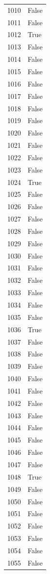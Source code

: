 \documentclass[
  letterpaper,
  DIV=11,
  numbers=noendperiod]{scrreprt}
\begin{document}
\begin{tabular}{ll}
1010 &  False \\
1011 &  False \\
1012 &   True \\
1013 &  False \\
1014 &  False \\
1015 &  False \\
1016 &  False \\
1017 &  False \\
1018 &  False \\
1019 &  False \\
1020 &  False \\
1021 &  False \\
1022 &  False \\
1023 &  False \\
1024 &   True \\
1025 &  False \\
1026 &  False \\
1027 &  False \\
1028 &  False \\
1029 &  False \\
1030 &  False \\
1031 &  False \\
1032 &  False \\
1033 &  False \\
1034 &  False \\
1035 &  False \\
1036 &   True \\
1037 &  False \\
1038 &  False \\
1039 &  False \\
1040 &  False \\
1041 &  False \\
1042 &  False \\
1043 &  False \\
1044 &  False \\
1045 &  False \\
1046 &  False \\
1047 &  False \\
1048 &   True \\
1049 &  False \\
1050 &  False \\
1051 &  False \\
1052 &  False \\
1053 &  False \\
1054 &  False \\
1055 &  False \\

\end{tabular}
\end{document}

